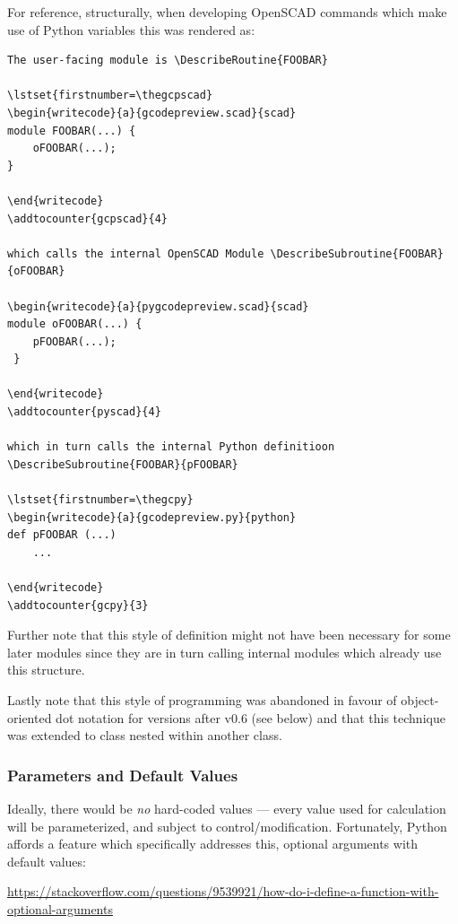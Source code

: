 \documentclass{ltxdoc}
\begin{document}
For reference, structurally, when developing OpenSCAD commands which make use of Python variables this was rendered as:

\begin{verbatim}
The user-facing module is \DescribeRoutine{FOOBAR}

\lstset{firstnumber=\thegcpscad}
\begin{writecode}{a}{gcodepreview.scad}{scad}
module FOOBAR(...) {
    oFOOBAR(...);
}

\end{writecode}
\addtocounter{gcpscad}{4}
 
which calls the internal OpenSCAD Module \DescribeSubroutine{FOOBAR}{oFOOBAR}

\begin{writecode}{a}{pygcodepreview.scad}{scad}
module oFOOBAR(...) {
    pFOOBAR(...);
 }
 
\end{writecode}
\addtocounter{pyscad}{4}

which in turn calls the internal Python definitioon \DescribeSubroutine{FOOBAR}{pFOOBAR}

\lstset{firstnumber=\thegcpy}
\begin{writecode}{a}{gcodepreview.py}{python}
def pFOOBAR (...)
    ...
    
\end{writecode}
\addtocounter{gcpy}{3}
\end{verbatim}

Further note that this style of definition might not have been necessary for some later modules since they are in turn calling internal modules which already use this structure.

Lastly note that this style of programming was abandoned in favour of object-oriented dot notation for versions after v0.6 (see below) and that this technique was extended to class nested within another class.

\subsubsection{Parameters and Default Values}

Ideally, there would be \emph{no} hard-coded values --- every value used for calculation will be parameterized, and subject to control/modification. Fortunately, Python affords a feature which specifically addresses this, optional arguments with default values:

\noindent\url{https://stackoverflow.com/questions/9539921/how-do-i-define-a-function-with-optional-arguments}
\end{document}
